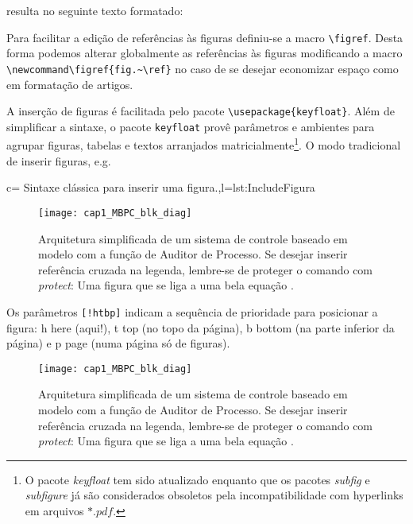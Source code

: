 resulta no seguinte texto formatado:


Para facilitar a edição de referências às figuras definiu-se a macro  \verb|\figref|. Desta forma podemos alterar globalmente as referências às figuras modificando a macro   \verb|\newcommand\figref{fig.~\ref}| no caso de se desejar economizar espaço como em formatação de artigos.

	A inserção de figuras é facilitada pelo pacote \verb|\usepackage{keyfloat}|. Além de simplificar a sintaxe, o pacote \verb|keyfloat| provê parâmetros e ambientes para agrupar figuras, tabelas e textos arranjados matricialmente\footnote{O pacote \emph{keyfloat} tem sido atualizado enquanto que os pacotes \emph{subfig} e \emph{subfigure} já são considerados obsoletos pela incompatibilidade com hyperlinks em arquivos $*.pdf$.}. O  modo tradicional de inserir figuras, e.g.
	
	
\begin{keyfigure}{c= {Sintaxe clássica para inserir uma figura.},l=lst:IncludeFigura}
\lstset{language=[Latex]Tex}
\begin{highlightblock}
\begin{figure}[!htbp]
	\centering
	\texttt{[image: cap1\_MBPC\_blk\_diag]} 
	\caption{Arquitetura simplificada de um sistema de controle baseado em 
		modelo 	com a função de Auditor de Processo. Se desejar inserir 
		referência cruzada na legenda, lembre-se de proteger o comando com 
		\emph{protect}: Uma figura que se liga a uma bela 
		equação \protect{}.}
	\label{fig:cap1_MBPC_blk_diag}
\end{figure}
\end{highlightblock}
\end{keyfigure}

Os parâmetros \verb|[!htbp]| indicam a sequência de prioridade para posicionar a figura: \textsf{h} here (aqui!), \textsf{t} top (no topo da página), \textsf{b} bottom (na parte inferior da página) e \textsf{p} page (numa página só de figuras).
\begin{figure}[!htbp]
	\centering
	\texttt{[image: cap1\_MBPC\_blk\_diag]} 
	\caption{Arquitetura simplificada de um sistema de controle baseado em modelo com a função de Auditor de Processo. Se desejar inserir referência cruzada na legenda, lembre-se de proteger o comando com \emph{protect}: Uma figura que se liga a uma bela equação \protect{}.}
	\label{fig:cap1_MBPC_blk_diag}
\end{figure}

